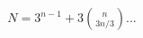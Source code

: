 \documentclass[preview]{standalone}
\begin{document}
\begin{align*}
N = 3^{n-1} + 3 \binom{n}{3n/3} ...
\end{align*}
\end{document}
